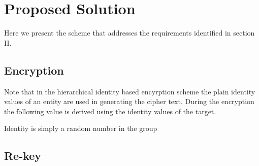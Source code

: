 \section{Proposed Solution}

Here we present the scheme that addresses the requirements identified in section II.

\subsection{Encryption}
Note that in the hierarchical identity based encyrption scheme \cite{BBG05} the plain identity values of an entity are used in generating the cipher text. During the encryption the following value is derived using the identity values of the target.

Identity is simply a random number in the group


\subsection{Re-key}
